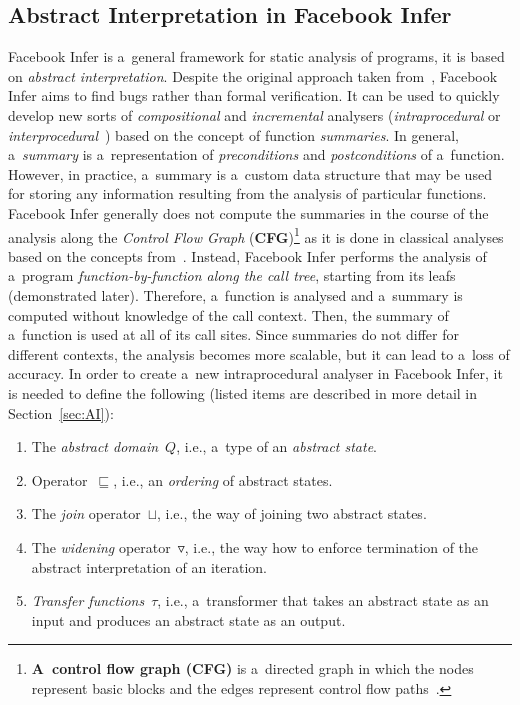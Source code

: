\subsection{Abstract Interpretation in Facebook Infer}
\label{sec:fbinferAI}

Facebook Infer is a~general framework for static analysis of programs, it is
based on \emph{abstract interpretation}. Despite the original approach
taken from~\cite{inferBiabduction}, Facebook Infer  aims to find bugs rather
than formal verification. It can be used to quickly develop new sorts of
\emph{compositional} and \emph{incremental} analysers (\emph{intraprocedural}
or \emph{interprocedural}~\cite{programAnalysisNielson}) based
on the concept of function \emph{summaries}. In general, a~\emph{summary}
is a~representation of \emph{preconditions} and \emph{postconditions} of
a~function. However, in practice, a~summary is a~custom data structure that
may be used for storing any information resulting from the analysis of
particular functions. Facebook Infer generally does not compute the summaries
in the course of the analysis along the \emph{Control Flow Graph}
(\textbf{CFG})\footnote{\textbf{A~control flow graph (CFG)} is a~directed
graph in which the nodes represent basic blocks and the edges represent control
flow paths~\cite{controlFlowAnalysisAllen}. } as it is done in classical
analyses based on the concepts from~\cite{DFAGraphReach,
DFAApproaches}. Instead, Facebook Infer performs the
analysis of a~program \emph{function-by-function along the call tree},
starting from its leafs (demonstrated later). Therefore, a~function
is analysed and a~summary is computed without knowledge of the
call context. Then, the summary of a~function is used at all of its call
sites. Since summaries do not differ for different contexts, the analysis
becomes more scalable, but it can lead to a~loss of accuracy. In order
to create a~new intraprocedural analyser in Facebook Infer, it is needed to
define the following (listed items are described in more detail in
Section~\ref{sec:AI}):
\begin{enumerate}
    \item
        The \emph{abstract domain}~$ Q $, i.e., a~type of an
        \emph{abstract state}.

    \item
        Operator~$ \sqsubseteq $, i.e., an \emph{ordering} of abstract
        states.

    \item
        The \emph{join} operator~$ \sqcup $, i.e., the way of joining two
        abstract states.

    \item
        The \emph{widening} operator~$ \triangledown $, i.e., the way how to
        enforce termination of the abstract interpretation of an iteration.

    \item
        \emph{Transfer functions}~$ \tau $, i.e., a~transformer that
        takes an abstract state as an input and produces an abstract state
        as an output.
\end{enumerate}
